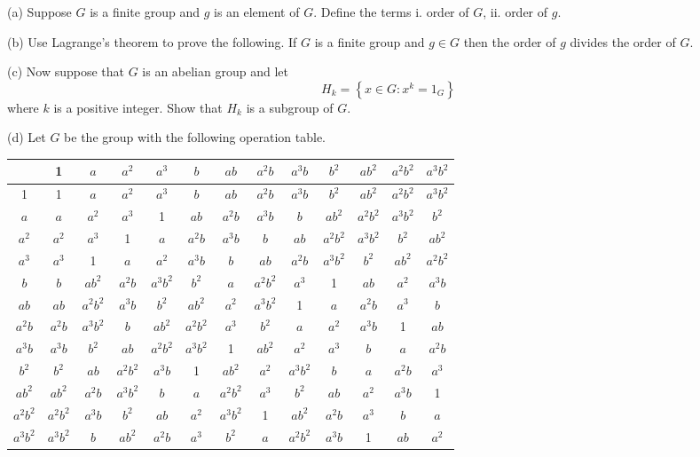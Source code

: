 %
\begin{question}{}{}
	(a) Suppose $G$ is a finite group and $g$ is an element of $G$. Define the terms
	i. order of $G$,
	ii. order of $g$.
	
	(b) Use Lagrange's theorem to prove the following.
	If $G$ is a finite group and $g \in G$ then the order of $g$ divides the order of $G$.
	
	(c) Now suppose that $G$ is an abelian group and let
	$$
	H_{k}=\left\{x \in G: x^{k}=1_{G}\right\}
	$$
	where $k$ is a positive integer. Show that $H_{k}$ is a subgroup of $G$.
	
	(d) Let $G$ be the group with the following operation table.
	
	\begin{center}
		\begin{tabular}{c|cccccccccccc} 
		& 1 & $a$ & $a^{2}$ & $a^{3}$ & $b$ & $a b$ & $a^{2} b$ & $a^{3} b$ & $b^{2}$ & $a b^{2}$ & $a^{2} b^{2}$ & $a^{3} b^{2}$ \\
		\hline 1 & 1 & $a$ & $a^{2}$ & $a^{3}$ & $b$ & $a b$ & $a^{2} b$ & $a^{3} b$ & $b^{2}$ & $a b^{2}$ & $a^{2} b^{2}$ & $a^{3} b^{2}$ \\
		$a$ & $a$ & $a^{2}$ & $a^{3}$ & 1 & $a b$ & $a^{2} b$ & $a^{3} b$ & $b$ & $a b^{2}$ & $a^{2} b^{2}$ & $a^{3} b^{2}$ & $b^{2}$ \\
		$a^{2}$ & $a^{2}$ & $a^{3}$ & 1 & $a$ & $a^{2} b$ & $a^{3} b$ & $b$ & $a b$ & $a^{2} b^{2}$ & $a^{3} b^{2}$ & $b^{2}$ & $a b^{2}$ \\
		$a^{3}$ & $a^{3}$ & 1 & $a$ & $a^{2}$ & $a^{3} b$ & $b$ & $a b$ & $a^{2} b$ & $a^{3} b^{2}$ & $b^{2}$ & $a b^{2}$ & $a^{2} b^{2}$ \\
		$b$ & $b$ & $a b^{2}$ & $a^{2} b$ & $a^{3} b^{2}$ & $b^{2}$ & $a$ & $a^{2} b^{2}$ & $a^{3}$ & 1 & $a b$ & $a^{2}$ & $a^{3} b$ \\
		$a b$ & $a b$ & $a^{2} b^{2}$ & $a^{3} b$ & $b^{2}$ & $a b^{2}$ & $a^{2}$ & $a^{3} b^{2}$ & 1 & $a$ & $a^{2} b$ & $a^{3}$ & $b$ \\
		$a^{2} b$ & $a^{2} b$ & $a^{3} b^{2}$ & $b$ & $a b^{2}$ & $a^{2} b^{2}$ & $a^{3}$ & $b^{2}$ & $a$ & $a^{2}$ & $a^{3} b$ & 1 & $a b$ \\
		$a^{3} b$ & $a^{3} b$ & $b^{2}$ & $a b$ & $a^{2} b^{2}$ & $a^{3} b^{2}$ & 1 & $a b^{2}$ & $a^{2}$ & $a^{3}$ & $b$ & $a$ & $a^{2} b$ \\
		$b^{2}$ & $b^{2}$ & $a b$ & $a^{2} b^{2}$ & $a^{3} b$ & 1 & $a b^{2}$ & $a^{2}$ & $a^{3} b^{2}$ & $b$ & $a$ & $a^{2} b$ & $a^{3}$ \\
		$a b^{2}$ & $a b^{2}$ & $a^{2} b$ & $a^{3} b^{2}$ & $b$ & $a$ & $a^{2} b^{2}$ & $a^{3}$ & $b^{2}$ & $a b$ & $a^{2}$ & $a^{3} b$ & 1 \\
		$a^{2} b^{2}$ & $a^{2} b^{2}$ & $a^{3} b$ & $b^{2}$ & $a b$ & $a^{2}$ & $a^{3} b^{2}$ & 1 & $a b^{2}$ & $a^{2} b$ & $a^{3}$ & $b$ & $a$ \\
		$a^{3} b^{2}$ & $a^{3} b^{2}$ & $b$ & $a b^{2}$ & $a^{2} b$ & $a^{3}$ & $b^{2}$ & $a$ & $a^{2} b^{2}$ & $a^{3} b$ & 1 & $a b$ & $a^{2}$
	\end{tabular}
	\end{center}


\end{question}
